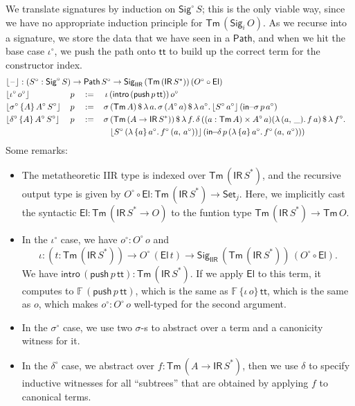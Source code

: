 \documentclass[acmsmall,screen,review]{acmart}
\newcommand{\msf}[1]{{\mathsf{#1}}}
\newcommand{\mbb}[1]{\mathbb{#1}}
\newcommand{\push}{\mathsf{push}}
\newcommand{\Set}{\msf{Set}}
\newcommand{\El}{\msf{El}}
\newcommand{\Sig}{\msf{Sig}}
\newcommand{\ttt}{\msf{tt}}
\newcommand{\blank}{{\mathord{\hspace{1pt}\text{--}\hspace{1pt}}}}
\newcommand{\IR}{\msf{IR}}
\newcommand{\intro}{\msf{intro}}
\newcommand{\IIR}{\msf{IIR}}
\newcommand{\floord}[1]{\lfloor #1 \rfloor}
\newcommand{\Tm}{\msf{Tm}}
\newcommand{\w}{\circ}
\newcommand{\Path}{\msf{Path}}
\newcommand{\insigma}{\msf{in}\!\!-\!\!\sigma}
\newcommand{\indelta}{\msf{in}\!\!-\!\!\delta}
\newcommand{\F}{\mbb{F}}
\begin{document}
\begin{definition} We translate signatures by induction on $\Sig^\w\,S$;
this is the only viable way, since we have no appropriate induction principle for
$\Tm\,(\Sig_i\,O)$.  As we recurse into a signature, we store the data that we have seen in a
$\Path$, and when we hit the base case $\iota^\w$, we push the path onto $\ttt$ to build up the
correct term for the constructor index.
\begin{alignat*}{5}
  &\rlap{$\floord{\blank} : (S^\w : \Sig^\w\,S) \to \Path\,S^\w \to \Sig_\IIR\,(\Tm\,(\IR\,S^*))\,(O^\w\circ \El)$}\\
  &\floord{\iota^\w\,o^\w}\,&&p               &&:=\,&&\,\iota\,(\intro\,(\push\,p\,\ttt))\,o^\w\\
  &\floord{\sigma^\w\,\{A\}\,A^\w\,S^\w}\,&&p &&:=\,&&\sigma\,(\Tm\,A)\,\$\,\lambda\,a.\,\sigma\,(A^\w\,a)\,\$\,\lambda\,a^\w.\,\floord{S^\w\,a^\w}\,(\insigma\,p\,a^\w)\\
  &\floord{\delta^\w\,\{A\}\,A^\w\,S^\w}\,&&p &&:=\,&&\sigma\,(\Tm\,(A \to \IR\,S^*))\,\$\,\lambda\,f.\,\delta\,((a : \Tm\,A) \times A^\w\,a) (\lambda\,(a,\,\_).\,f\,a)\,\$\,\lambda\,f^\w.\\
  &                       &&              &&   &&\hspace{0.8em}\floord{S^\w\,(\lambda\,\{a\}\,a^\w.\,f^\w\,(a,\,a^\w))}\,(\indelta\,p\,(\lambda\,\{a\}\,a^\w.\,f^\w\,(a,\,a^\w)))
\end{alignat*}
Some remarks:
\begin{itemize}
  \item The metatheoretic IIR type is indexed over $\Tm\,(\IR\,S^*)$, and the recursive output type
    is given by $O^\w\circ \El : \Tm\,(\IR\,S^*) \to \Set_j$. Here, we implicitly cast the syntactic
    $\El : \Tm\,(\IR\,S^* \to O)$ to the funtion type $\Tm\,(\IR\,S^*) \to \Tm\,O$.
  \item In the $\iota^\w$ case, we have $o^\w : O^\w\,o$ and
    \[ \iota : (t : \Tm\,(\IR\,S^*)) \to O^\w\,(\El\,t) \to \Sig_\IIR\,(\Tm\,(\IR\,S^*))\,(O^\w\circ \El). \]
    We have $\intro\,(\push\,p\,\ttt) : \Tm\,(\IR\,S^*)$. If we apply $\El$ to this term, it computes
    to $\F\,(\push\,p\,\ttt)$, which is the same as $\F\,\{\iota\,o\}\,\ttt$, which is the same
    as $o$, which makes $o^\w : O^\w\,o$ well-typed for the second argument.
  \item In the $\sigma^\w$ case, we use two $\sigma$-s to abstract over a term and a canonicity witness for it.
  \item In the $\delta^\w$ case, we abstract over $f : \Tm\,(A \to \IR\,S^*)$, then we use $\delta$ to specify inductive
        witnesses for all ``subtrees'' that are obtained by applying $f$ to canonical terms.
\end{itemize}
\end{definition}
\end{document}
